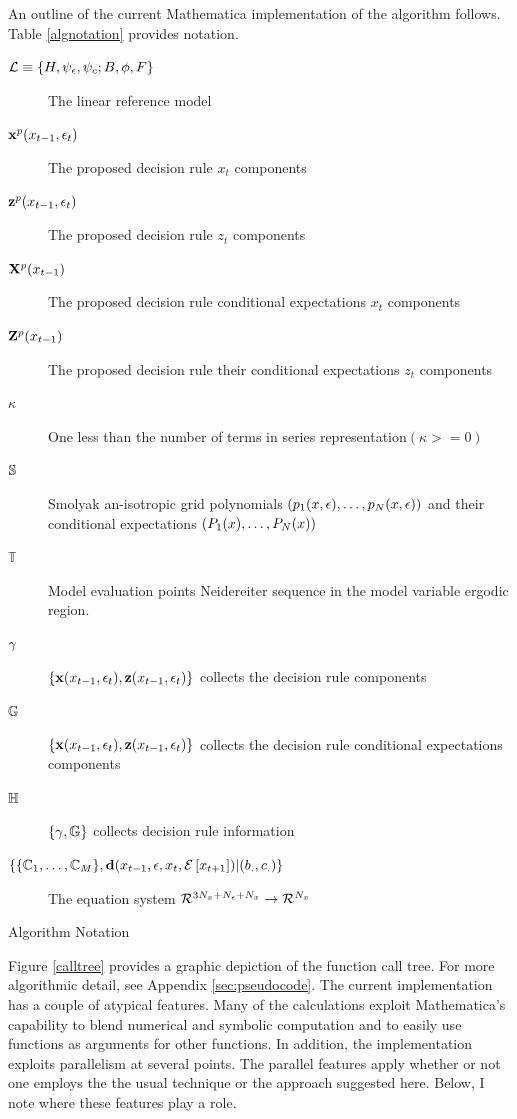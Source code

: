 \documentclass[12pt]{article}
\begin{document}
An outline of the current Mathematica implementation of the algorithm follows.
Table \ref{algnotation} provides notation.
\begin{table}[h]
  \centering
\begin{description}
\item[${\mathcal{L}}\equiv {\{H,\psi_\epsilon,\psi_c;B,\phi,F\}}$] The linear reference model
\item[$ \mathbf{x}^{p}(x_{t-1},\epsilon_t)$] The proposed decision rule  $x_t$ components
\item[$ \mathbf{z}^{p}(x_{t-1},\epsilon_t)$]The proposed decision rule  $z_t$ components
\item[$ \mathbf{X}^p(x_{t-1})$] The proposed decision rule conditional expectations  $x_t$ components
\item[$ \mathbf{Z}^p(x_{t-1})$] The proposed decision rule their conditional expectations  $z_t$ components
\item[$ \kappa$] One less than the number of terms in series representation$(\kappa>=0)$
\item[$\mathbb{S}$] Smolyak an-isotropic grid polynomials $(p_{1}(x,\epsilon),\ldots,p_{N}(x,\epsilon))$ and their conditional expectations $(P_{1}(x),\ldots,P_{N}(x))$
\item[$\mathbb{T}$] Model evaluation points Neidereiter sequence in the model variable ergodic region.
\item[$ {{\gamma}}$]  $\{\mathbf{x}(x_{t-1},\epsilon_t),\mathbf{z}(x_{t-1},\epsilon_t)\}$ collects the decision rule components
\item[$ {\mathbb{G}}$]  $\{\mathbf{x}(x_{t-1},\epsilon_t),\mathbf{z}(x_{t-1},\epsilon_t)\}$ collects the decision rule conditional expectations components
\item[$\mathbb{H}$] $\{{{\gamma}},{\mathbb{G}}\}$ collects decision rule information
\item[$\{\{\mathbb{C}_{1},\ldots,\mathbb{C}_{M}\},\mathbf{d}(x_{t-1},\epsilon,x_t,{\mathcal{E}\left [ x_{t+1} \right ]})|(b_.,c_.)\}$] The equation system ${{\mathcal{R}^{3{N_x}+{N_\epsilon}+{N_x}}}\rightarrow{\mathcal{R}^{{N_x}}}}$
\end{description}

  \caption{Algorithm Notation}\label{algnotation}
\end{table}
Figure \ref{calltree}
provides a graphic depiction of the function call tree. For more algorithmic detail, see Appendix \ref{sec:pseudocode}. 
The current implementation  has a couple of atypical features.  
Many of the calculations exploit Mathematica's capability to blend
numerical and symbolic computation and to easily use functions as arguments for
other functions.  In addition, the implementation exploits parallelism at
several points.   The parallel features apply whether or not one employs the
the  usual technique or the approach suggested here.
Below, I note where these features play a role.
\end{document}
